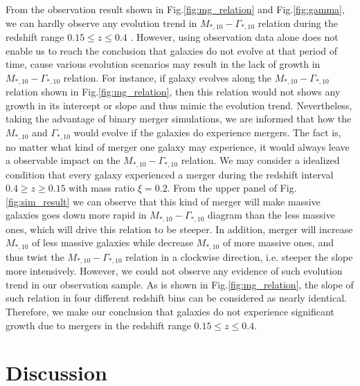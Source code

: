 \documentclass[fleqn,usenatbib]{mnras}
\begin{document}
\par From the observation result shown in Fig.\ref{fig:mg_relation} and Fig.\ref{fig:gamma}, we can hardly observe any evolution trend in $M_{*,10} - \Gamma_{*,10}$ relation during the redshift range $ 0.15 \leq z \leq 0.4$ . However, using observation data alone does not enable us to reach the conclusion that galaxies do not evolve at that period of time, cause various evolution scenarios may result in the lack of growth in $M_{*,10} - \Gamma_{*,10}$ relation. For instance, if galaxy evolves along the $M_{*,10} - \Gamma_{*,10}$ relation shown in Fig.\ref{fig:mg_relation}, then this relation would not shows any growth in its intercept or slope and thus mimic the evolution trend. Nevertheless, taking the advantage of binary merger simulations, we are informed that how the $M_{*,10} $ and $\Gamma_{*,10}$ would evolve if the galaxies do experience mergers. The fact is, no matter what kind of merger one galaxy may experience, it would always leave a observable impact on the $M_{*,10} - \Gamma_{*,10}$ relation. We may consider a idealized condition that every galaxy experienced a merger during the redshift interval $0.4 \geq z \geq 0.15$ with mass ratio $\xi = 0.2$. From the upper panel of Fig.\ref{fig:sim_result} we can observe that this kind of merger will make massive galaxies goes down more rapid in $M_{*,10}-\Gamma_{*,10}$ diagram than the less massive ones, which will drive this relation to be steeper. In addition, merger will increase $M_{*,10}$ of less massive galaxies while decrease $M_{*,10}$ of more massive ones, and thus twist the $M_{*,10}-\Gamma_{*,10}$ relation in a clockwise direction, i.e. steeper the slope more intensively. However, we could not observe any evidence of such evolution trend in our observation sample. As is shown in Fig.\ref{fig:mg_relation}, the slope of such relation in four different redshift bins can be considered as nearly identical. Therefore, we make our conclusion that galaxies do not experience significant growth due to mergers in the redshift range $0.15 \leq z \leq 0.4$.
\section{Discussion}
\end{document}
